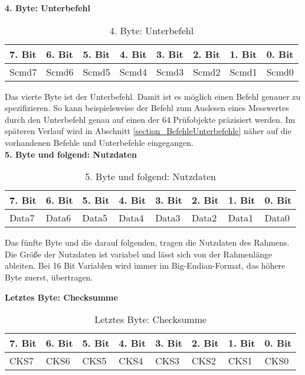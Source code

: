 \textbf{4. Byte: Unterbefehl}

\begin{table}[H]
\begin{center}
\begin{tabularx}{\textwidth}{|X|X|X|X|X|X|X|X|}\hline
 7. Bit & 6. Bit & 5. Bit & 4. Bit & 3. Bit & 2. Bit & 1. Bit & 0. Bit\\ \hline
 Scmd7 & Scmd6 & Scmd5 & Scmd4 & Scmd3 & Scmd2 & Scmd1 & Scmd0\\ \hline
\end{tabularx}
\caption{4. Byte: Unterbefehl}
\label{table_4Byte}
\end{center}
\end{table}

Das vierte Byte ist der Unterbefehl. Damit ist es möglich einen Befehl genauer zu spezifizieren. So kann beispielsweise der Befehl zum Auslesen eines Messwertes durch den Unterbefehl genau auf einen der 64 Prüfobjekte präzisiert werden. Im späteren Verlauf wird in Abschnitt \ref{section_BefehleUnterbefehle} näher auf die vorhandenen Befehle und Unterbefehle eingegangen.\\



\textbf{5. Byte und folgend: Nutzdaten}

\begin{table}[H]
\begin{center}
\begin{tabularx}{\textwidth}{|X|X|X|X|X|X|X|X|}\hline
 7. Bit & 6. Bit & 5. Bit & 4. Bit & 3. Bit & 2. Bit & 1. Bit & 0. Bit\\ \hline
 Data7 & Data6 & Data5 & Data4 & Data3 & Data2 & Data1 & Data0\\ \hline
\end{tabularx}
\caption{5. Byte und folgend: Nutzdaten}
\label{table_5Byte}
\end{center}
\end{table}

Das fünfte Byte und die darauf folgenden, tragen die Nutzdaten des Rahmens. Die Größe der Nutzdaten ist variabel und lässt sich von der Rahmenlänge ableiten. Bei 16 Bit Variablen wird immer im Big-Endian-Format, das höhere Byte zuerst, übertragen. \\


\newpage

\textbf{Letztes Byte: Checksumme}

\begin{table}[H]
\begin{center}
\begin{tabularx}{\textwidth}{|X|X|X|X|X|X|X|X|}\hline
 7. Bit & 6. Bit & 5. Bit & 4. Bit & 3. Bit & 2. Bit & 1. Bit & 0. Bit\\ \hline
 CKS7 & CKS6 & CKS5 & CKS4 & CKS3 & CKS2 & CKS1 & CKS0\\ \hline
\end{tabularx}
\caption{Letztes Byte: Checksumme}
\label{table_LastByte}
\end{center}
\end{table}

